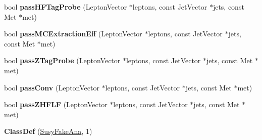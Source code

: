 \begin{DoxyCompactItemize}
\item 
\hypertarget{classSusyFakeAna_a1f57517c038bdff8c7d72382f6b1a4ef}{
bool {\bfseries passHFTagProbe} (LeptonVector $\ast$leptons, const JetVector $\ast$jets, const Met $\ast$met)}
\label{classSusyFakeAna_a1f57517c038bdff8c7d72382f6b1a4ef}

\item 
\hypertarget{classSusyFakeAna_a8291a6aa3456fbe47a871d8d73671f4b}{
bool {\bfseries passMCExtractionEff} (LeptonVector $\ast$leptons, const JetVector $\ast$jets, const Met $\ast$met)}
\label{classSusyFakeAna_a8291a6aa3456fbe47a871d8d73671f4b}

\item 
\hypertarget{classSusyFakeAna_a738e92eae29559931cd367864f4093ad}{
bool {\bfseries passZTagProbe} (LeptonVector $\ast$leptons, const JetVector $\ast$jets, const Met $\ast$met)}
\label{classSusyFakeAna_a738e92eae29559931cd367864f4093ad}

\item 
\hypertarget{classSusyFakeAna_acfa1a2eec99956376334bdf5d8b5c5f8}{
bool {\bfseries passConv} (LeptonVector $\ast$leptons, const JetVector $\ast$jets, const Met $\ast$met)}
\label{classSusyFakeAna_acfa1a2eec99956376334bdf5d8b5c5f8}

\item 
\hypertarget{classSusyFakeAna_a5bf02cd10aef9593b878cc8650fec46d}{
bool {\bfseries passZHFLF} (LeptonVector $\ast$leptons, const JetVector $\ast$jets, const Met $\ast$met)}
\label{classSusyFakeAna_a5bf02cd10aef9593b878cc8650fec46d}

\item 
\hypertarget{classSusyFakeAna_a68866a94b43515c6cabfbe5cacf08b2c}{
{\bfseries ClassDef} (\hyperlink{classSusyFakeAna}{SusyFakeAna}, 1)}
\label{classSusyFakeAna_a68866a94b43515c6cabfbe5cacf08b2c}

\end{DoxyCompactItemize}
